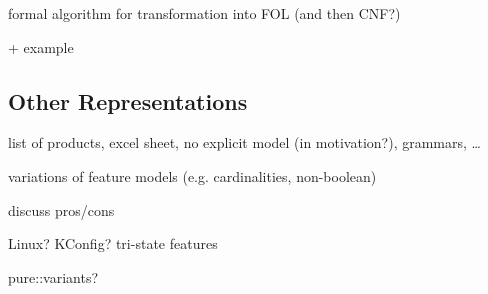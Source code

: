formal algorithm for transformation into FOL (and then CNF?)

+ example


\subsection{Other Representations}

list of products, excel sheet, no explicit model (in motivation?), grammars, \dots

variations of feature models (e.g. cardinalities, non-boolean)

discuss pros/cons

Linux? KConfig? tri-state features

pure::variants?

